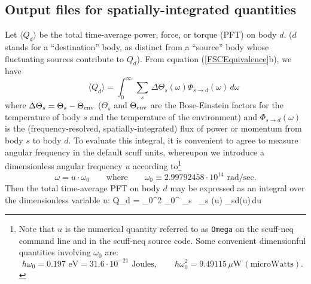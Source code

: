 \documentclass[letterpaper]{article}
\begin{document}
\newpage
\subsection{Output files for spatially-integrated quantities}

Let $\big\langle Q_d\big\rangle$ be the total time-average 
power, force, or torque (PFT) on body $d$. ($d$ stands for a 
``destination'' body, as distinct from a ``source'' body
whose fluctuating sources contribute to $Q_d$). From 
equation (\ref{FSCEquivalence}b), we have
\begin{equation}
 \qquad \big\langle Q_d\big\rangle
 = \int_0^\infty \, \sum_s \, \Delta \Theta_s(\omega) 
   \Phi_{s\to d}(\omega)\,d\omega
\end{equation}
where $\Delta\Theta_s=\Theta_s-\Theta_{\text{\scriptsize env}}$ ($\Theta_s$ and
$\Theta_{\text{\scriptsize env}}$ are the Bose-Einstein factors for the 
temperature of body $s$ and the temperature of the environment)
and $\Phi_{s \to d}(\omega)$ is the 
(frequency-resolved, spatially-integrated) flux of power or momentum
from body $s$ to body $d$.
To evaluate this integral, it is convenient to agree to measure angular
frequency in the default {\sc scuff} units, whereupon we 
introduce a dimensionless angular frequency $u$ according 
to\footnote{Note that $u$ is the numerical quantity referred to as 
\texttt{Omega} on the {\sc scuff-neq} command line and in the 
{\sc scuff-neq} source code. Some convenient
dimensionful quantities involving $\omega_0$ are:
$$
 \hbar\omega_0=0.197\text{ eV}=31.6\cdot10^{-21} \text{ Joules}, 
 \qquad 
 \hbar\omega_0^2=9.49115\,\mu\text{W} \, (\text{microWatts}).
$$}
$$ \omega=u\cdot \omega_0
   \qquad \text{where} \qquad
   \omega_0\equiv 2.99792458\cdot 10^{14}\text{ rad/sec}.
$$
Then the total time-average PFT on body $d$ may be
expressed as an integral over the dimensionless variable $u$:
{
 \qquad \big\langle Q_d\big\rangle
 = \hbar \omega_0^2
   \int_0^\infty 
              \sum_s \, \Delta \wh \Theta_s (u) \Phi{}_{s\to d}(u)\,du
}
\end{document}
